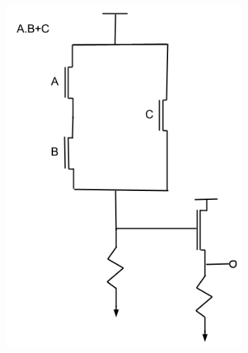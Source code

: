 {\begin{solution}
\begin{figure}[h!]
\begin{subfigure}[H]{0.4\textwidth}
			\end{subfigure}
			\quad
			\begin{subfigure}[H]{0.4\textwidth}
				\includegraphics[width=\textwidth]{images/solution433.png}
			\end{subfigure}
			\begin{subfigure}[H]{0.4\textwidth}

\end{subfigure}
\end{figure}
\end{solution}}
